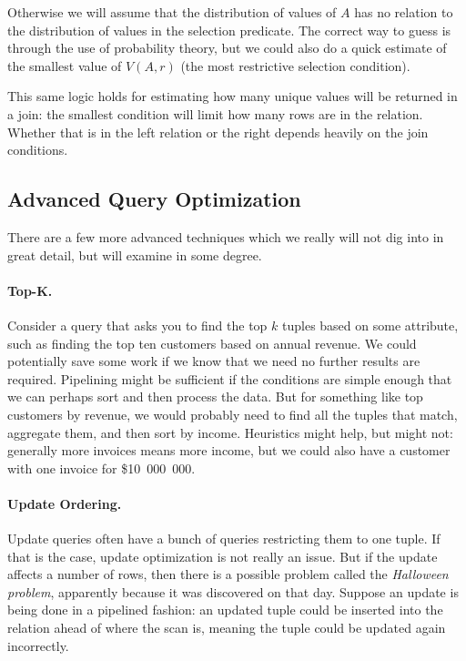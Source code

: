 Otherwise we will assume that the distribution of values of $A$ has no relation to the distribution of values in the selection predicate. The correct way to guess is through the use of probability theory, but we could also do a quick estimate of the smallest value of $V(A, r)$ (the most restrictive selection condition). 

This same logic holds for estimating how many unique values will be returned in a join: the smallest condition will limit how many rows are in the relation. Whether that is in the left relation or the right depends heavily on the join conditions. 

\subsection*{Advanced Query Optimization}

There are a few more advanced techniques which we really will not dig into in great detail, but will examine in some degree. 

\paragraph{Top-K.} Consider a query that asks you to find the top $k$ tuples based on some attribute, such as finding the top ten customers based on annual revenue. We could potentially save some work if we know that we need no further results are required. Pipelining might be sufficient if the conditions are simple enough that we can perhaps sort and then process the data. But for something like top customers by revenue, we would probably need to find all the tuples that match, aggregate them, and then sort by income. Heuristics might help, but might not: generally more invoices means more income, but we could also have a customer with one invoice for \$10~000~000. 

\paragraph{Update Ordering.} 

Update queries often have a bunch of queries restricting them to one tuple. If that is the case, update optimization is not really an issue. But if the update affects a number of rows, then there is a possible problem called the \textit{Halloween problem}, apparently because it was discovered on that day. Suppose an update is being done in a pipelined fashion: an updated tuple could be inserted into the relation ahead of where the scan is, meaning the tuple could be updated again incorrectly. 

